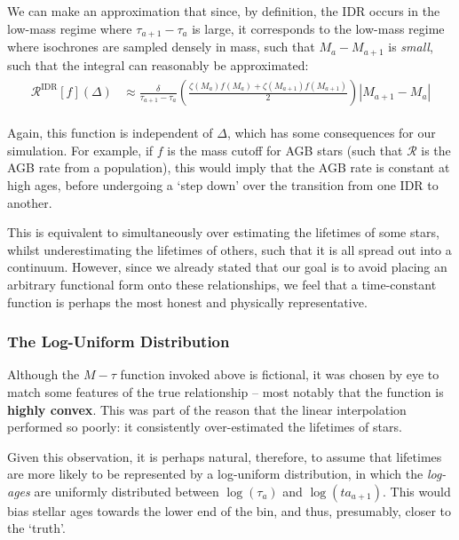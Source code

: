 \documentclass[a4paper,11pt]{article}
\begin{document}
\begin{aside}
					We can make an approximation that since, by definition, the IDR occurs in the low-mass regime where $\tau_{a+1} - \tau_a$ is large, it corresponds to the low-mass regime where isochrones are sampled densely in mass, such that $M_{a} - M_{a+1}$ is \textit{small}, such that the integral can reasonably be approximated:
					\begin{align}
						\begin{split}
						\mathcal{R}^\text{IDR}[f](\Delta) &\approx  \frac{\delta}{\tau_{a+1} - \tau_a} \left(\frac{\zeta(M_a) f(M_a) + \zeta(M_{a+1}) f(M_{a+1})}{2}\right)\left|M_{a+1} - M_a\right|
						\end{split}
					\end{align}
					
					
					Again, this function is independent of $\Delta$, which has some consequences for our simulation. For example, if $f$ is the mass cutoff for AGB stars (such that $\mathcal{R}$ is the AGB rate from a population), this would imply that the AGB rate is constant at high ages, before undergoing a `step down' over the transition from one IDR to another. 

					This is equivalent to simultaneously over estimating the lifetimes of some stars, whilst underestimating the lifetimes of others, such that it is all spread out into a continuum. However, since we already stated that our goal is to avoid placing an arbitrary functional form onto these relationships, we feel that a time-constant function  is perhaps the most honest and physically representative.

				\subsubsection{The Log-Uniform Distribution}

					Although the $M-\tau$ function invoked above is fictional, it was chosen by eye to match some features of the true relationship -- most notably that the function is \textbf{highly convex}. This was part of the reason that the linear interpolation performed so poorly: it consistently over-estimated the lifetimes of stars. 

					Given this observation, it is perhaps natural, therefore, to assume that lifetimes are more likely to be represented by a log-uniform distribution, in which the \textit{log-ages} are uniformly distributed between $\log(\tau_a)$ and $\log(ta_{a+1})$. This would bias stellar ages towards the lower end of the bin, and thus, presumably, closer to the `truth'.


\end{aside}
\end{document}
